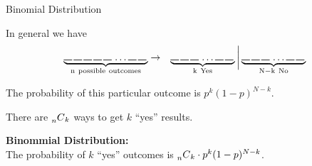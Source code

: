\begin{frame}{Binomial Distribution}

  In general we have 
  \begin{eqnarray*}
    \underbrace{
      \rule{.3cm}{.2mm} \hspace{.05cm} 
      \rule{.3cm}{.2mm} \hspace{.05cm} 
      \rule{.3cm}{.2mm} \hspace{.05cm} 
      \rule{.3cm}{.2mm} \hspace{.05cm} 
      \rule{.3cm}{.2mm} \hspace{.05cm} \ldots
      \rule{.3cm}{.2mm} \hspace{.05cm} 
      \rule{.3cm}{.2mm} \hspace{.05cm}}_{\mathrm{n~possible~outcomes}}
    & \rightarrow & 
    \underbrace{
      \rule{.3cm}{.2mm} \hspace{.05cm} 
      \rule{.3cm}{.2mm} \hspace{.05cm} 
      \rule{.3cm}{.2mm} \hspace{.05cm} \ldots
      \rule{.3cm}{.2mm} \hspace{.05cm} 
      \rule{.3cm}{.2mm} \hspace{.05cm}}_{\mathrm{k~Yes}}
    \bigg|
    \underbrace{
      \rule{.3cm}{.2mm} \hspace{.05cm} 
      \rule{.3cm}{.2mm} \hspace{.05cm} 
      \rule{.3cm}{.2mm} \hspace{.05cm} \ldots
      \rule{.3cm}{.2mm} \hspace{.05cm} 
      \rule{.3cm}{.2mm} \hspace{.05cm}}_{\mathrm{N-k~No}}
  \end{eqnarray*}

  \vfill

  The probability of this particular outcome is $p^k(1-p)^{N-k}$. 

  \vfill

  There are $\prescript{~}{n}{C}_k$ ways to get $k$ ``yes'' results.
  
  \vfill

  \textbf{Binommial Distribution:}\\
  {\color{red}
    The probability of $k$ ``yes'' outcomes is 
    $\prescript{~}{n}{C}_k \cdot p^k (1-p)^{N-k}$.} 

  \vfill

  
\end{frame}



